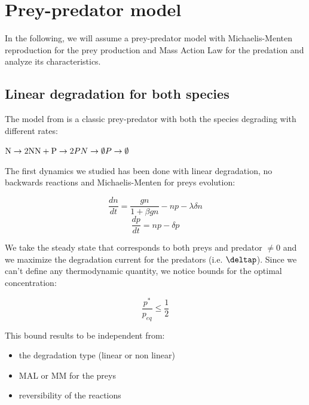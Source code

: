 \documentclass{article}
\begin{document}
	
	
	\section{Prey-predator model}
	In the following, we will assume a prey-predator model with Michaelis-Menten reproduction for the prey production and Mass Action Law for the predation and analyze its characteristics.
	
	\subsection{Linear degradation for both species} \label{MMNOREV}
	The model from \cite{2} is a classic prey-predator with both the species degrading with different rates:
	
	\begin{center}
		$\mathrm{N} \rightarrow\mathrm{2N}\\
		\mathrm{N+P} \rightarrow 2P\\
		N  \rightarrow \emptyset\\
		P \rightarrow \emptyset$
	\end{center}
	
	The first dynamics we studied has been done with linear degradation, no backwards reactions and Michaelis-Menten for preys evolution:
	
	\begin{equation}
		\frac{dn}{dt}=\frac{gn}{1+\beta g n}-n p-\lambda \delta n
	\end{equation}
	\begin{equation}
		\frac{dp}{dt}=n p-\delta p
	\end{equation}
	
	We take the steady state that corresponds to both preys and predator $\neq 0$ and we maximize the degradation current for the predators (i.e. $\deltap$). Since we can't define any thermodynamic quantity, we notice bounds for the optimal concentration:
	
	$$\frac{p^*}{p_{eq}}\le \frac{1}{2}$$
	
	This bound results to be independent from:
	\begin{itemize}
		\item the degradation type (linear or non linear)
		\item MAL or MM for the preys
		\item reversibility of the reactions
		
	\end{itemize}
	
\end{document}
